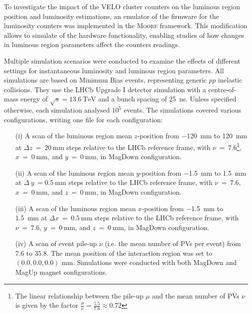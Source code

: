 To investigate the impact of the VELO cluster counters on the luminous region position and luminosity estimations, an emulator of the firmware for the luminosity counters was implemented in the \textsc{Moore} framework. This modification allows to simulate of the hardware functionality, enabling studies of how changes in luminous region parameters affect the counters readings.

Multiple simulation scenarios were conducted to examine the effects of different settings for instantaneous luminosity and luminous region parameters. All simulations are based on Minimum Bias events, representing generic $pp$ inelastic collisions. They use the LHCb Upgrade I detector simulation with a centre-of-mass energy of $\sqrt{s} = \SI{13.6}{\tera\eV}$ and a bunch spacing of \SI{25}{\nano\second}. Unless specified otherwise, each simulation analysed $10^5$ events. The simulations covered various configurations, writing one file for each configuration:

\begin{enumerate}

    \item[(i)] A scan of the luminous region mean $z$-position from \SI{-120}{\milli\meter} to \SI{120}{\milli\meter} at $\Delta z~=~\SI{20}{\milli\meter}$ steps relative to the LHCb reference frame, with $\nu~=~7.6$\footnote{The linear relationship between the pile-up $\mu$ and the mean number of PVs $\nu$ is given by the factor $\tfrac{\mu}{\nu}=\frac{5.5}{7.6}\approx 0.72$}, $x~=~\SI{0}{\milli\meter}$, and $y~=~\SI{0}{\milli\meter}$, in MagDown configuration.

    \item[(ii)] A scan of the luminous region mean $y$-position from \SI{-1.5}{\milli\meter} to \SI{1.5}{\milli\meter} at $\Delta~y~=\SI{0.5}{\milli\meter}$ steps relative to the LHCb reference frame, with $\nu~=~7.6$, $x~=~\SI{0}{\milli\meter}$, and $z~=~\SI{0}{\milli\meter}$, in MagDown configuration.

     \item[(iii)] A scan of the luminous region mean $x$-position from \SI{-1.5}{\milli\meter} to \SI{1.5}{\milli\meter} at $\Delta x~=~\SI{0.5}{\milli\meter}$ steps relative to the LHCb reference frame, with $\nu~=~7.6$, $y~=~\SI{0}{\milli\meter}$, and $z~=~\SI{0}{\milli\meter}$, in MagDown configuration.

     \item[(iv)] A scan of event pile-up $\nu$ (i.e. the mean number of PVs per event) from $7.6$ to $35.8$. The mean position of the interaction region was set to $(0.0, 0.0, 0.0)$ mm. Simulations were conducted with both MagDown and MagUp magnet configurations.

\end{enumerate}


